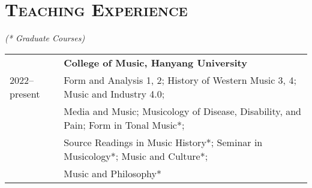\documentclass[a4paper,11pt,draft]{article}
\begin{document}
  \newpage
  \section*{\textsc{Teaching Experience}}
  \textit{(* Graduate Courses)}
  \vspace{5.0mm}
    
  \hspace*{-0.77cm}
  \begin{tabular}{p{2.5cm} l}
    & \textbf{College of Music, Hanyang University}\\
    2022–present & Form and Analysis 1, 2; History of Western Music 3, 4; Music and Industry 4.0;\\
    & Media and Music; Musicology of Disease, Disability, and Pain; Form in Tonal Music*;\\
    & Source Readings in Music History*; Seminar in Musicology*; Music and Culture*;\\
    & Music and Philosophy*
  \end{tabular}
\end{document}
